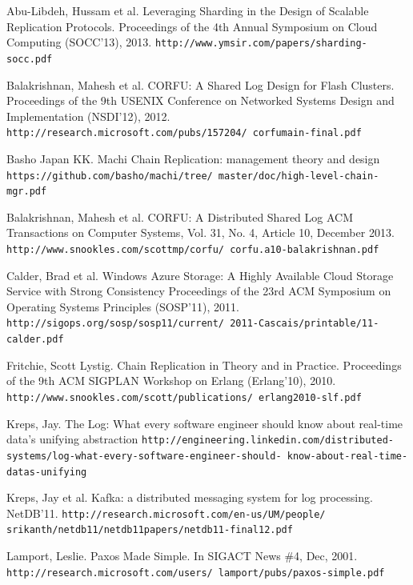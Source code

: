 \documentclass[preprint,10pt]{sigplanconf}
\begin{document}

\begin{thebibliography}{}
\softraggedright

Abu-Libdeh, Hussam et al.
Leveraging Sharding in the Design of Scalable Replication Protocols.
Proceedings of the 4th Annual Symposium on Cloud Computing (SOCC'13), 2013.
{\tt http://www.ymsir.com/papers/sharding-socc.pdf}

Balakrishnan, Mahesh et al.
CORFU: A Shared Log Design for Flash Clusters.
Proceedings of the 9th USENIX Conference on Networked Systems Design
and Implementation (NSDI'12), 2012.
{\tt http://research.microsoft.com/pubs/157204/ corfumain-final.pdf}

Basho Japan KK.
Machi Chain Replication: management theory and design
{\tt https://github.com/basho/machi/tree/ master/doc/high-level-chain-mgr.pdf}

Balakrishnan, Mahesh et al.
CORFU: A Distributed Shared Log
ACM Transactions on Computer Systems, Vol. 31, No. 4, Article 10, December 2013.
{\tt http://www.snookles.com/scottmp/corfu/ corfu.a10-balakrishnan.pdf}

Calder, Brad et al.
Windows Azure Storage: A Highly Available Cloud Storage Service with Strong Consistency
Proceedings of the 23rd ACM Symposium on Operating Systems Principles (SOSP'11), 2011.
{\tt http://sigops.org/sosp/sosp11/current/ 2011-Cascais/printable/11-calder.pdf}

Fritchie, Scott Lystig.
Chain Replication in Theory and in Practice.
Proceedings of the 9th ACM SIGPLAN Workshop on Erlang (Erlang'10), 2010.
{\tt http://www.snookles.com/scott/publications/ erlang2010-slf.pdf}

Kreps, Jay.
The Log: What every software engineer should know about real-time data's unifying abstraction
{\tt http://engineering.linkedin.com/distributed-
  systems/log-what-every-software-engineer-should-
  know-about-real-time-datas-unifying}

Kreps, Jay et al.
Kafka: a distributed messaging system for log processing.
NetDB’11.
{\tt http://research.microsoft.com/en-us/UM/people/
  srikanth/netdb11/netdb11papers/netdb11-final12.pdf}

Lamport, Leslie.
Paxos Made Simple.
In SIGACT News \#4, Dec, 2001.
{\tt http://research.microsoft.com/users/ lamport/pubs/paxos-simple.pdf}


\end{thebibliography}
\end{document}
